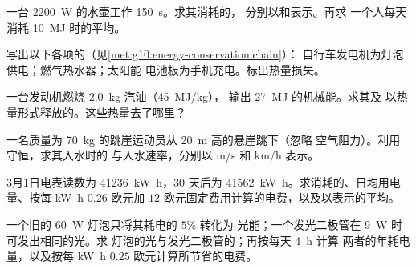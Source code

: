 \begin{exercise}[$\star$]\label{exo:g10:energy-conservation:4}
一台 \qty{2200}{W} 的水壶工作 \qty{150}{s}。求其消耗的，
分别以和表示。再求
一个人每天消耗 \qty{10}{MJ} 时的平均。
\end{exercise}

\begin{exercise}[$\star$]\label{exo:g10:energy-conservation:5}
写出以下各项的（见\cref{met:g10:energy-conservation:chain}）：
自行车发电机为灯泡供电；燃气热水器；太阳能
电池板为手机充电。标出热量损失。
\end{exercise}

\begin{exercise}[$\star\star$]\label{exo:g10:energy-conservation:6}
一台发动机燃烧 \qty{2.0}{kg} 汽油（\qty{45}{MJ/kg}），
输出 \qty{27}{MJ} 的机械能。求其及
以热量形式释放的。这些热量去了哪里？
\end{exercise}

\begin{exercise}[$\star\star$]\label{exo:g10:energy-conservation:7}
一名质量为 \qty{70}{kg} 的跳崖运动员从 \qty{20}{m} 高的悬崖跳下（忽略
空气阻力）。利用守恒，求其入水时的
与入水速率，分别以 \unit{m/s} 和 \unit{km/h} 表示。
\end{exercise}

\begin{exercise}[$\star\star$]\label{exo:g10:energy-conservation:8}
3月1日电表读数为 \qty{41236}{kW.h}，30
天后为 \qty{41562}{kW.h}。求消耗的、日均用电量、按每
\unit{kW.h} $0.26$ 欧元加 $12$ 欧元固定费用计算的电费，以及以表示的平均。
\end{exercise}

\begin{exercise}[$\star\star$]\label{exo:g10:energy-conservation:9}
一个旧的 \qty{60}{W} 灯泡只将其耗电的 $5\%$ 转化为
光能；一个发光二极管在 \qty{9}{W} 时可发出相同的光。求
灯泡的光与发光二极管的；再按每天 \qty{4}{h} 计算
两者的年耗电量，以及按每
\unit{kW.h} $0.25$ 欧元计算所节省的电费。
\end{exercise}

